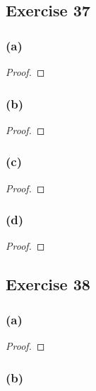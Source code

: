 \documentclass[14pt]{extarticle}
\begin{document}
\subsection{Exercise 37}

\subsubsection{(a)}

\begin{proof}

\end{proof}

\subsubsection{(b)}

\begin{proof}

\end{proof}

\subsubsection{(c)}

\begin{proof}

\end{proof}

\subsubsection{(d)}

\begin{proof}

\end{proof}

\subsection{Exercise 38}

\subsubsection{(a)}

\begin{proof}

\end{proof}

\subsubsection{(b)}
\end{document}
